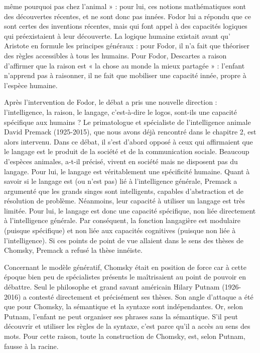 même pourquoi pas chez l'animal » : pour lui, ces notions mathématiques sont des découvertes
récentes, et ne sont donc pas innées. Fodor lui a répondu que ce sont certes des inventions récentes,
mais qui font appel à des capacités logiques qui préexistaient à leur découverte. La logique
humaine existait avant qu’ Aristote en formule les principes généraux : pour Fodor, il n’a fait que
théoriser des règles accessibles à tous les humains. Pour Fodor, Descartes a raison d'affirmer que
la raison est « la chose au monde la mieux partagée » : l'enfant n'apprend pas à raisonner, il ne fait
que mobiliser une capacité innée, propre à l'espèce humaine.

Après l'intervention de Fodor, le débat a pris une nouvelle direction : l'intelligence, la raison, le
langage, c'est-à-dire le logos, sont-ils une capacité spécifique aux humains ? Le primatologue et
spécialiste de l'intelligence animale David Premack (1925-2015), que nous avons déjà rencontré
dans le chapitre 2, est alors intervenu. Dans ce débat, il s'est d'abord opposé à ceux qui affirmaient
que le langage est le produit de la société et de la communication sociale. Beaucoup d'espèces
animales, a-t-il précisé, vivent en société mais ne disposent pas du langage. Pour lui, le langage
est véritablement une spécificité humaine. Quant à savoir si le langage est (ou n'est pas) lié à
l'intelligence générale, Premack a argumenté que les grands singes sont intelligents, capables
d’abstraction et de résolution de problème. Néanmoins, leur capacité à utiliser un langage est très
limitée. Pour lui, le langage est donc une capacité spécifique, non liée directement à l'intelligence
générale. Par conséquent, la fonction langagière est modulaire (puisque spécifique) et non liée aux
capacités cognitives (puisque non liée à l'intelligence). Si ces points de point de vue allaient dans
le sens des thèses de Chomsky, Premack a refusé la thèse innéiste.

Concernant le modèle génératif, Chomsky était en position de force car à cette époque bien peu
de spécialistes présents le maîtrisaient au point de pouvoir en débattre. Seul le philosophe et grand
savant américain Hilary Putnam (1926-2016) a contesté directement et précisément ses thèses.
Son angle d'attaque a été que pour Chomsky, la sémantique et la syntaxe sont indépendantes. Or,
selon Putnam, l'enfant ne peut organiser ses phrases sans la sémantique. S'il peut découvrir et
utiliser les règles de la syntaxe, c’est parce qu'il a accès au sens des mots. Pour cette raison, toute
la construction de Chomsky, est, selon Putnam, fausse à la racine.

